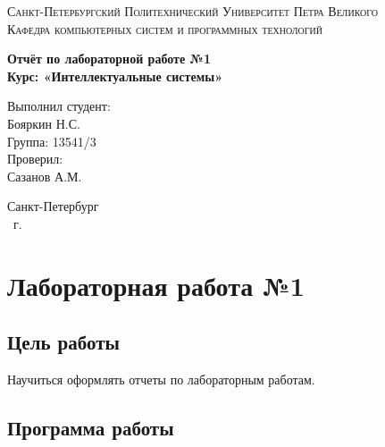 \documentclass[14pt,a4paper,report]{report}
\begin{document}
\def\contentsname{Содержание}

\begin{titlepage}
	\begin{center}
		\textsc{Санкт-Петербургский Политехнический 
			Университет Петра Великого\\[5mm]
			Кафедра компьютерных систем и программных технологий}
		
		\vfill
		
		\textbf{Отчёт по лабораторной работе №1\\[3mm]
			Курс: «Интеллектуальные системы»\\[41mm]
		}
	\end{center}
	
	\hfill
	\begin{minipage}{.4\textwidth}
		Выполнил студент:\\[2mm] 
		Бояркин Н.С.\\
		Группа: 13541/3\\[5mm]
		
		Проверил:\\[2mm] 
		Сазанов А.М.
	\end{minipage}
	\vfill
	\begin{center}
		Санкт-Петербург\\ \the\year\ г.
	\end{center}
\end{titlepage}

\tableofcontents
\clearpage

\chapter{Лабораторная работа №1}

\section{Цель работы}

Научиться оформлять отчеты по лабораторным работам.

\section{Программа работы}
\end{document}
